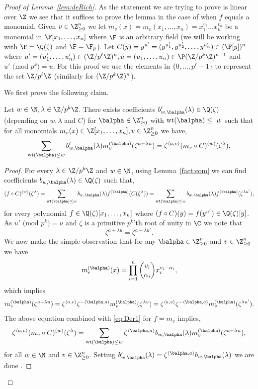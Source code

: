 \begin{proof}[Proof of Lemma~\ref{lem:deRich}]
As the statement we are trying to prove is linear over $\Z$ we see that it suffices to prove the lemma in the case of when $f$ equals a monomial. Given $v\in \Z_{\ge 0}^n$ we let $m_v(x)=m_v(x_1,\hdots,x_n)=x_1^{v_1}\hdots x_n^{v_n}$ be a monomial in $\F[x_1,\hdots,x_n]$ where $\F$ is an arbitrary field (we will be working with $\F=\Q(\zeta)$ and $\F=\F_p$).
Let $C(y)=y^{u'}=(y^{u'_1},y^{u'_2},\hdots,y^{u'_n})\in (\F[y])^n$ where $u'=(u'_1,\hdots,u'_n)\in (\Z/p^\ell\Z)^n,u=(u_1,\hdots,u_n)\in \P (\Z/p^k\Z)^{n-1}$ and $u' \text{ (mod }p^k\text{)}=u$. For this proof we use the elements in $ \{0,\hdots, p^\ell -1\}$ to represent the set $\Z/p^\ell\Z$ (similarly for $(\Z/p^k\Z)^n$).

We first prove the following claim.
\begin{claim}\label{cl:inter}
Let $w\in \N, \lambda \in \Z/p^k\Z$. There exists coefficients $b'_{w,\balpha}(\lambda)\in \Q(\zeta)$ (depending on $w,\lambda$ and $C$) for $\balpha\in \Z_{\ge 0}^n$ with $\text{wt}(\balpha)\le~w$ such that for all monomials $m_v(x)\in \Z[x_1,\hdots,x_n],v\in\Z_{\ge 0}^n$ we have,
$$\sum\limits_{\text{wt}(\balpha)\le w} b'_{w,\balpha}(\lambda) m_v^{(\balpha)}(\zeta^{a+\lambda u})=\zeta^{\langle a,v\rangle} (m_v\circ C)^{(w)}(\zeta^\lambda).$$
\end{claim}
\begin{proof}
For every $\lambda \in \Z/p^k\Z$ and $w\in \N$, using Lemma~\ref{fact:com} we can find coefficients $b_{w,\balpha}(\lambda)\in \Q(\zeta)$ such that,
\begin{align}\label{eq:Der1}
(f\circ C)^{(w)}(\zeta^{\lambda})= \sum\limits_{\text{wt}(\balpha)\le w} b_{w,\balpha}(\lambda) f^{(\balpha)}(C(\zeta^{\lambda}))= \sum\limits_{\text{wt}(\balpha)\le w} b_{w,\balpha}(\lambda) f^{(\balpha)}(\zeta^{\lambda u'}),
\end{align}
for every polynomial $f\in \Q(\zeta)[x_1,\hdots,x_n]$ where $(f\circ C)(y)=f(y^{u'})\in \Q(\zeta)[y]$. As $u' \text{ (mod }p^k\text{)}=u$ and $\zeta$ is a primitive $p^k$'th root of unity in $\C$ we note that 
$$\zeta^{a+\lambda u}=\zeta^{a+\lambda u'}.$$
We now make the simple observation that for any $\balpha \in \Z_{\ge 0}^n$ and $v\in \Z_{\ge 0}^n$ we have 
$$m^{(\balpha)}_v(x)=\prod\limits_{i=1}^n\binom{v_i}{\alpha_i} x_i^{v_i-\alpha_i},$$
which implies
$$m^{(\balpha)}_v(\zeta^{a+\lambda u})=\zeta^{\langle a,v\rangle}\zeta^{-\langle \balpha,a\rangle}m^{(\balpha)}_v(\zeta^{\lambda u})=\zeta^{\langle a,v\rangle}\zeta^{-\langle \balpha,a\rangle}m^{(\balpha)}_v(\zeta^{\lambda u'}).$$
The above equation combined with \eqref{eq:Der1} for $f=m_v$ implies,
\begin{align*}
    \zeta^{\langle a,v\rangle} (m_v\circ C)^{(w)}(\zeta^\lambda)=\sum\limits_{\text{wt}(\balpha)\le w} \zeta^{\langle \balpha,a\rangle}b_{w,\balpha}(\lambda) m_v^{(\balpha)}(\zeta^{a+\lambda u}),
\end{align*}
for all $w\in \N$ and $v\in \Z_{\ge 0}^n$. Setting $b'_{w,\balpha}(\lambda)=\zeta^{\langle \balpha,a\rangle}b_{w,\balpha}(\lambda)$ we are done .
\end{proof}


\end{proof}
